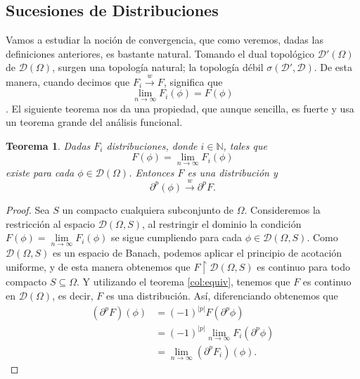 \documentclass[letter,12pt]{article}
\newtheorem{theorem}{Teorema}
\begin{document}
\subsection{Sucesiones de Distribuciones}
Vamos a estudiar la noción de convergencia, que como veremos, dadas las definiciones
anteriores, es bastante natural. Tomando el dual topológico $ \mathscr{D}'(\Omega) $
de $ \mathscr{D}(\Omega) $, surgen una topología natural; la topología débil
$ \sigma(\mathscr{D}', \mathscr{D}) $.
De esta manera, cuando decimos que $ F_i \overset{w}{\longrightarrow} F $, significa que
\[  \underset{n\to \infty}{\lim}{F_i}(\phi) = F (\phi)  \].
El siguiente teorema nos da una propiedad, que aunque sencilla, es fuerte y usa un teorema
grande del análisis funcional.
\begin{theorem}\normalfont
	Dadas $ F_i $ distribuciones, donde $ i \in \mathbb{N} $, tales que
	\begin{equation}
		F(\phi) = \underset{n\to \infty}{\lim}{F_i}(\phi)
	\end{equation}
existe para cada $ \phi \in \mathscr{D}(\Omega) $. Entonces $ F $ es una distribución y
\begin{equation}
	\partial^{p}(\phi) \overset{w}{\longrightarrow} \partial^p F.
\end{equation}
\end{theorem}
\begin{proof}
	Sea $ S $ un compacto cualquiera subconjunto de $ \Omega $.
	Consideremos la restricción al espacio $ \mathscr{D}(\Omega, S) $, al restringir el dominio
	la condición $ F(\phi) = \underset{n\to \infty}{\lim}{F_i}(\phi) $ se sigue cumpliendo para
	cada $ \phi \in \mathscr{D}(\Omega, S) $. Como $ \mathscr{D}(\Omega, S)  $ es un espacio 
	de Banach, podemos aplicar el principio de acotación uniforme, y de esta manera
	obtenemos que $ F\restriction{ \mathscr{D}(\Omega, S)} $ es continuo para todo compacto
 	$ S\subseteq\Omega $. Y utilizando el teorema \ref{col:equiv}, tenemos que $ F $
 	es continuo en $ \mathscr{D}(\Omega) $, es decir, $ F $ es una distribución.
 	Así, diferenciando obtenemos que
 	\begin{equation}
 		\begin{split}
 			(\partial^p F)(\phi) &= (-1)^{|p|} F(\partial^p \phi) \\
 			& = (-1)^{|p|} \underset{n\to \infty}{\lim}{F_i}(\partial^p \phi)\\
 			& = \underset{n\to \infty}{\lim}{(\partial^p F_i)}(\phi).
 		\end{split}
 	\end{equation}
\end{proof}
\end{document}
